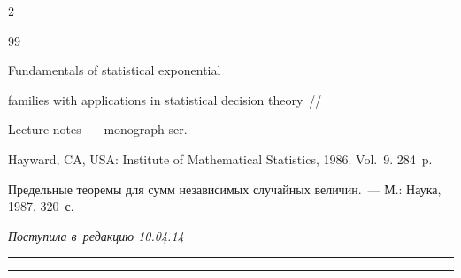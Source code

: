 \begin{multicols}{2}
{{\begin{thebibliography}{99}




 Fundamentals of statistical exponential


 families with applications in statistical decision theory~//


 Lecture notes~--- monograph ser.~--- 


 Hayward, CA, USA: Institute of Mathematical Statistics, 1986.  Vol.~9. 284~p.






 Предельные теоремы для сумм независимых случайных величин.~--- М.: Наука, 1987. 320~с.


 \end{thebibliography}





 }


 }





\end{multicols}





\vspace*{-9pt}





\hfill{\small\textit{Поступила в~редакцию 10.04.14}}










\vspace*{12pt}





\hrule





\vspace*{2pt}





\hrule











